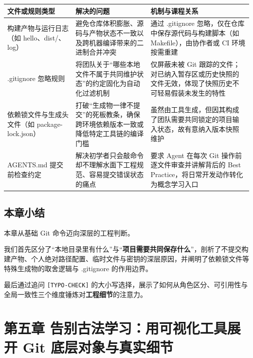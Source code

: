 \documentclass[UTF8,a4paper,11pt,fontset=fandol]{ctexart}
\begin{document}
\begin{center}\small\begin{tabularx}{\linewidth}{YYY}

\toprule

文件或规则类型 & 解决的问题 & 机制与课程关系\\\midrule

构建产物与运行日志（如 hello、dist/、log） & 避免仓库体积膨胀、源码与产物状态不一致以及跨机器编译带来的二进制合并冲突 & 通过 .gitignore 忽略，仅在仓库中保存源代码与构建脚本（如 Makefile），由协作者或 CI 环境按需重建\\[3pt]

.gitignore 忽略规则 & 将团队关于“哪些本地文件不属于共同维护状态”的约定固化为自动化过滤机制 & 仅屏蔽未被 Git 跟踪的文件；对已纳入暂存区或历史快照的文件无效，体现了快照历史不可轻易假装未发生的特性\\[3pt]

依赖锁文件与生成头文件（如 package-lock.json） & 打破“生成物一律不提交”的死板教条，确保跨环境依赖版本一致或降低特定工具链的编译门槛 & 虽然由工具生成，但因其构成了团队需要共同锁定的项目输入状态，故有意纳入版本快照维护\\[3pt]

AGENTS.md 提交前检查约定 & 解决初学者只会敲命令却不理解水面下工程规范、容易提交错误状态的痛点 & 要求 Agent 在每次 Git 操作前逐文件审查并讲解背后的 Best Practice，将日常开发动作转化为概念学习入口\\[3pt]

\bottomrule\end{tabularx}\end{center}

\subsection{本章小结}

本章从基础 Git 命令迈向深层的工程判断。

我们首先区分了“本地目录里有什么”与“\textbf{项目需要共同保存什么}”，剖析了不提交构建产物、个人绝对路径配置、临时文件与密钥的深层原因，并阐明了依赖锁文件等特殊生成物的取舍逻辑与 .gitignore 的作用边界。

最后通过追问 \texttt{[TYPO-CHECK]} 的大小写选择，展示了如何从角色区分、可引用性与全局一致性三个维度锤炼对\textbf{工程细节}的注意力。

\section{第五章 告别古法学习：用可视化工具展开 Git 底层对象与真实细节}
\end{document}
